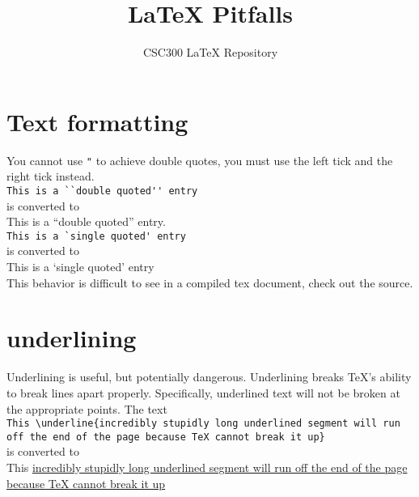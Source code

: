 \documentclass[11pt]{article}
\begin{document}
\author{CSC300 \LaTeX{} Repository}
\title{\LaTeX{} Pitfalls}
\maketitle

\section{Text formatting}


You cannot use \verb+"+ to achieve double quotes, you must use the left tick
and the right tick instead. \\

\verb+This is a ``double quoted'' entry+ \\

is converted to  \\

This is a ``double quoted'' entry. \\

\verb+This is a `single quoted' entry+ \\

is converted to \\

This is a `single quoted' entry \\

This behavior is difficult to see in a compiled tex document, check out the 
source.

\section{underlining}

Underlining is useful, but potentially dangerous. Underlining breaks TeX's ability to break lines apart properly.  Specifically, underlined text will not be broken at the appropriate points.  The text \\

\verb+This \underline{incredibly stupidly long underlined segment will run off the end of the page because TeX cannot break it up}+ \\

is converted to  \\

This \underline{incredibly stupidly long underlined segment will run off the end of the page because TeX cannot break it up} \\
\end{document}
